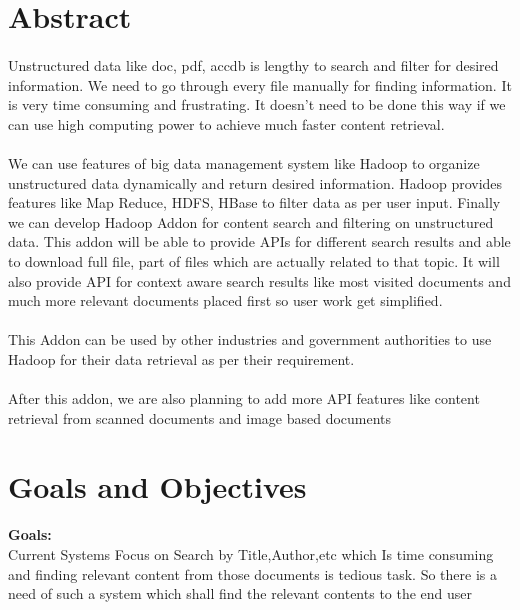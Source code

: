 \documentclass[oneside,a4paper,12pt]{report}
\begin{document}
\section{Abstract}
\paragraph{} 
Unstructured data like doc, pdf, accdb is lengthy to search and filter for desired information. We need to go through every file manually for finding information. It is very time consuming and frustrating. It doesn’t need to be done this way if we can use high computing power to achieve much faster content retrieval. 

\paragraph{} 
We can use features of big data management system like Hadoop to organize unstructured data dynamically and return desired information. Hadoop provides features like Map Reduce, HDFS, HBase to filter data as per user input. Finally we can develop Hadoop Addon for content search and filtering on unstructured data. This addon will be able to provide APIs for different search results and able to download full file, part of files which are actually related to that topic. It will also provide API for context aware search results like most visited documents and much more relevant documents placed first so user work get simplified.  

\paragraph{}
This Addon can be used by other industries and government authorities to use Hadoop for their data retrieval as per their requirement. 

\paragraph{}
After this addon, we are also planning to add more API features like content retrieval from scanned documents and image based documents

\section{Goals and Objectives}

\textbf{Goals:} \\
Current Systems Focus on Search by Title,Author,etc which Is time consuming and finding relevant content from those documents is tedious task. So there is a need of such a system which shall find the relevant contents to the end user \\
\end{document}
